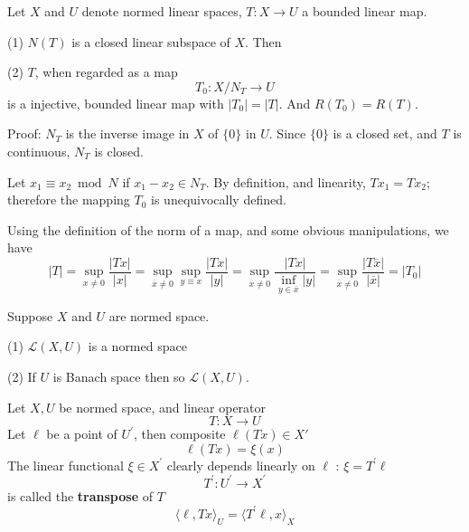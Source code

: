 \documentclass[12pt, oneside]{book}
\begin{document}
\begin{theorem}
    Let $X$ and $U$ denote normed linear spaces, $T: X \rightarrow U$ a bounded linear map.

    (1) $N\left(T\right)$ is a closed linear subspace of $X$. Then

    (2) $T$, when regarded as a map
    \begin{equation*}
        T_0:X/{N_{T}}\longrightarrow U
    \end{equation*}
    is a injective, bounded linear map with $\left|T_0\right|=|T|$. And $R\left(T_0\right)= R\left(T\right)$.


    Proof:
    $N_{T}$ is the inverse image in $X$ of $\{0\}$ in $U$. Since $\{0\}$ is a closed set, and $T$ is continuous, $N_{T}$ is closed.

    Let $x_1\equiv x_2 \bmod N$  if $x_1-x_2 \in N_{T}$. By definition, and linearity, $T x_1=T x_2$; therefore the mapping $T_0$ is unequivocally defined.

    Using the definition of the norm of a map, and some obvious manipulations, we have
    \begin{equation*}
        |T|
        =
        \sup _{x \neq 0} \frac{|T x|}{|x|}
        =
        \sup _{\overline{x} \neq 0} \sup_{y \equiv x} \frac{|T x|}{|y|}
        =
        \sup_{\overline{x} \neq 0} \frac{|T x|}{\inf\limits_{y\in \overline{x}} |y|}
        =
        \sup_{\overline{x} \neq 0} \frac{|T\overline{x}|}{|\overline{x}|}
        =
        \left|T_0\right|
    \end{equation*}
\end{theorem}


\begin{theorem}
    Suppose $X$ and $U$ are normed space.

    (1) $\mathcal{L}(X,U)$ is a normed space

    (2) If $U$ is Banach space then so $\mathcal{L}(X,U)$.
\end{theorem}

\begin{definition}
    Let $X,U$ be normed space, and linear operator
    \begin{equation*}
        T: X \rightarrow U
    \end{equation*}
    Let $\ell$ be a point of $U^{\prime}$, then composite $\ell(T x) \in X'$
    \begin{equation*}
        \ell(T x)=\xi(x)
    \end{equation*}
    The linear functional $\xi \in X^{\prime}$ clearly depends linearly on $\ell$ : $\xi=T^{\prime} \ell$
    \begin{equation*}
        T^{\prime}: U^{\prime} \rightarrow X^{\prime}
    \end{equation*}
    is called the \textbf{transpose} of $T$
    \begin{equation*}
        \langle \ell, Tx \rangle_U
        =
        \langle T^{\prime} \ell, x\rangle_X
    \end{equation*}
\end{definition}
\end{document}
